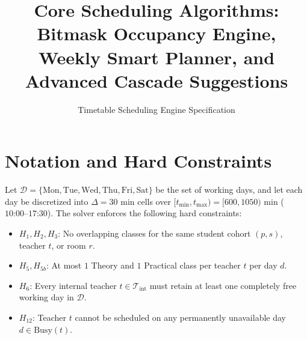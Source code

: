 \documentclass[11pt,a4paper]{article}
\title{\textbf{Core Scheduling Algorithms: Bitmask Occupancy Engine, Weekly Smart Planner, and Advanced Cascade Suggestions}}
\author{Timetable Scheduling Engine Specification}
\date{}
\begin{document}
\maketitle

\section*{Notation and Hard Constraints}
Let $\mathcal{D} = \{\text{Mon}, \text{Tue}, \text{Wed}, \text{Thu}, \text{Fri}, \text{Sat}\}$ be the set of working days, and let each day be discretized into $\Delta = 30\text{ min}$ cells over $[t_{\min}, t_{\max}) = [600, 1050)\text{ min}$ ($10\text{:}00\text{--}17\text{:}30$). The solver enforces the following hard constraints:
\begin{itemize}
    \item $H_1, H_2, H_3$: No overlapping classes for the same student cohort $(p, s)$, teacher $t$, or room $r$.
    \item $H_5, H_{5b}$: At most $1$ Theory and $1$ Practical class per teacher $t$ per day $d$.
    \item $H_6$: Every internal teacher $t \in \mathcal{T}_{\text{int}}$ must retain at least one completely free working day in $\mathcal{D}$.
    \item $H_{12}$: Teacher $t$ cannot be scheduled on any permanently unavailable day $d \in \text{Busy}(t)$.
\end{itemize}
\end{document}
